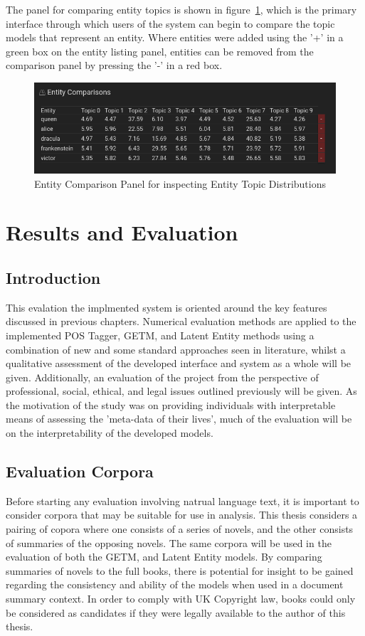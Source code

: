\documentclass[10pt]{report}
\begin{document}
The panel for comparing entity topics is shown in figure~\ref{fig:entity_compare}, which is the primary interface through which users of the system can begin to compare the topic models that represent an entity. Where entities were added using the '+' in a green box on the entity listing panel, entities can be removed from the comparison panel by pressing the '-' in a red box.

\begin{figure}[h]
  \centering
  \includegraphics[scale=0.55]{entity_compare.png}
  \caption{Entity Comparison Panel for inspecting Entity Topic Distributions\label{fig:entity_compare}}
\end{figure}

%
%
%
%
\chapter{Results and Evaluation}
\section{Introduction}
This evalation the implmented system is oriented around the key features discussed in previous chapters. Numerical evaluation methods are applied to the implemented POS Tagger, GETM, and Latent Entity methods using a combination of new and some standard approaches seen in literature, whilst a qualitative assessment of the developed interface and system as a whole will be given. Additionally, an evaluation of the project from the perspective of professional, social, ethical, and legal issues outlined previously will be given. As the motivation of the study was on providing individuals with interpretable means of assessing the 'meta-data of their lives', much of the evaluation will be on the interpretability of the developed models. 


\section{Evaluation Corpora}
Before starting any evaluation involving natrual language text, it is important to consider corpora that may be suitable for use in analysis. This thesis considers a pairing of copora where one consists of a series of novels, and the other consists of summaries of the opposing novels. The same corpora will be used in the evaluation of both the GETM, and Latent Entity models. By comparing summaries of novels to the full books, there is potential for insight to be gained regarding the consistency and ability of the models when used in a document summary context. In order to comply with UK Copyright law, books could only be considered as candidates if they were legally available to the author of this thesis.
\end{document}
